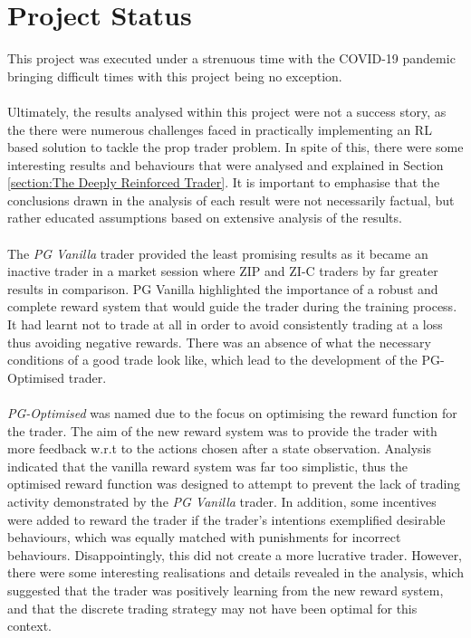 \documentclass[ %
                    author={Ashwinder Khurana},
                supervisor={Prof Dave Cliff},
                    degree={MEng},
                     title={The Deeply Reinforced Trader},
                  subtitle={},
                      type={enterprise},
                      year={2020} ]{dissertation}
\begin{document}
{\section{Project Status}
This project was executed under a strenuous time with the COVID-19 pandemic bringing difficult times with this project being no exception.
\\
\\
Ultimately, the results analysed within this project were not a success story, as the there were numerous challenges faced in practically implementing an RL based solution to tackle the prop trader problem. In spite of this, there were some interesting results and behaviours that were analysed and explained in Section \ref{section:The Deeply Reinforced Trader}. It is important to emphasise that the conclusions drawn in the analysis of each result were not necessarily factual, but rather educated assumptions based on extensive analysis of the results. 
\\
\\
The \textit{PG Vanilla} trader provided the least promising results as it became an inactive trader in a market session where ZIP and ZI-C traders by far greater results in comparison. PG Vanilla highlighted the importance of a robust and complete reward system that would guide the trader during the training process. It had learnt not to trade at all in order to avoid consistently trading at a loss thus avoiding negative rewards. There was an absence of what the necessary conditions of a good trade look like, which lead to the development of the PG-Optimised trader. 
\\
\\
\textit{PG-Optimised} was named due to the focus on optimising the reward function for the trader. The aim of the new reward system was to provide the trader with more feedback w.r.t to the actions chosen after a state observation. Analysis indicated that the vanilla reward system was far too simplistic, thus the optimised reward function was designed to attempt to prevent the lack of trading activity demonstrated by the \textit{PG Vanilla} trader. In addition, some incentives were added to reward the trader if the trader's intentions exemplified desirable behaviours, which was equally matched with punishments for incorrect behaviours. Disappointingly, this did not create a more lucrative trader. However, there were some interesting realisations and details revealed in the analysis, which suggested that the trader was positively learning from the new reward system, and that the discrete trading strategy may not have been optimal for this context. 
}
\end{document}
